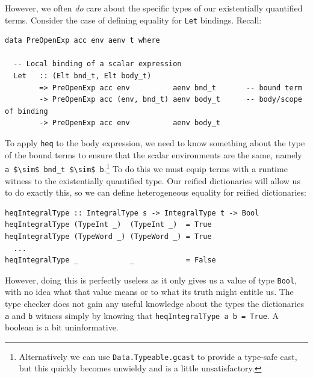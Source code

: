 However, we often \emph{do} care about the specific types of our existentially
quantified terms. Consider the case of defining equality for \texttt{Let}
bindings. Recall:
%
\begin{lstlisting}[style=haskell]
data PreOpenExp acc env aenv t where

  -- Local binding of a scalar expression
  Let   :: (Elt bnd_t, Elt body_t)
        => PreOpenExp acc env          aenv bnd_t       -- bound term
        -> PreOpenExp acc (env, bnd_t) aenv body_t      -- body/scope of binding
        -> PreOpenExp acc env          aenv body_t
\end{lstlisting}
%
To apply \texttt{heq} to the body expression, we need to know something about
the type of the bound terms to ensure that the scalar environments are the same,
namely \lstinline[mathescape]{a $\sim$ bnd_t $\sim$ b}.\footnote{Alternatively
we can use \texttt{Data.Typeable.gcast} to provide a type-safe cast, but this
quickly becomes unwieldy and is a little unsatisfactory.} To do this we must
equip terms with a runtime witness to the existentially quantified type. Our
reified dictionaries will allow us to do exactly this, so we can define
heterogeneous equality for reified dictionaries:
%
\begin{lstlisting}[style=haskell]
heqIntegralType :: IntegralType s -> IntegralType t -> Bool
heqIntegralType (TypeInt _)  (TypeInt _)  = True
heqIntegralType (TypeWord _) (TypeWord _) = True
  ...
heqIntegralType _            _            = False
\end{lstlisting}
%
However, doing this is perfectly useless as it only gives us a value of type
\texttt{Bool}, with no idea what that value means or to what its truth might
entitle us. The type checker does not gain any useful knowledge about the types
the dictionaries \texttt{a} and \texttt{b} witness simply by knowing that
\lstinline{heqIntegralType a b = True}. A boolean is a bit uninformative.

